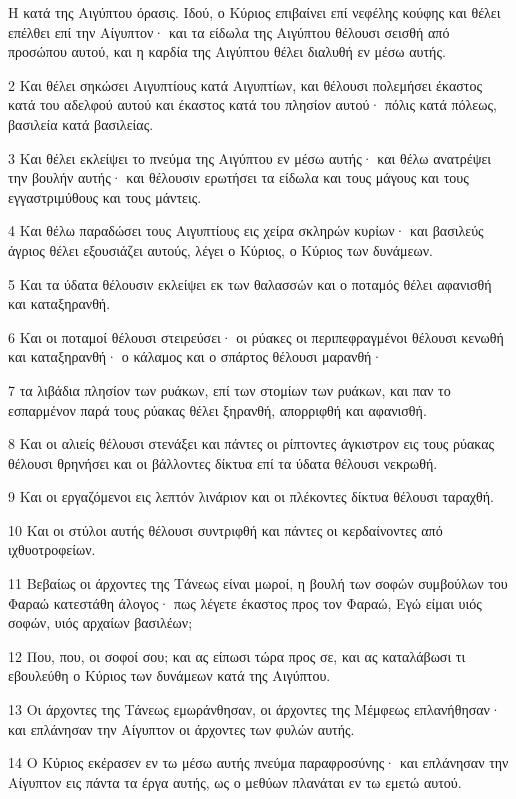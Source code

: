 \par Η κατά της Αιγύπτου όρασις. Ιδού, ο Κύριος επιβαίνει επί νεφέλης κούφης και θέλει επέλθει επί την Αίγυπτον· και τα είδωλα της Αιγύπτου θέλουσι σεισθή από προσώπου αυτού, και η καρδία της Αιγύπτου θέλει διαλυθή εν μέσω αυτής.
\par 2 Και θέλει σηκώσει Αιγυπτίους κατά Αιγυπτίων, και θέλουσι πολεμήσει έκαστος κατά του αδελφού αυτού και έκαστος κατά του πλησίον αυτού· πόλις κατά πόλεως, βασιλεία κατά βασιλείας.
\par 3 Και θέλει εκλείψει το πνεύμα της Αιγύπτου εν μέσω αυτής· και θέλω ανατρέψει την βουλήν αυτής· και θέλουσιν ερωτήσει τα είδωλα και τους μάγους και τους εγγαστριμύθους και τους μάντεις.
\par 4 Και θέλω παραδώσει τους Αιγυπτίους εις χείρα σκληρών κυρίων· και βασιλεύς άγριος θέλει εξουσιάζει αυτούς, λέγει ο Κύριος, ο Κύριος των δυνάμεων.
\par 5 Και τα ύδατα θέλουσιν εκλείψει εκ των θαλασσών και ο ποταμός θέλει αφανισθή και καταξηρανθή.
\par 6 Και οι ποταμοί θέλουσι στειρεύσει· οι ρύακες οι περιπεφραγμένοι θέλουσι κενωθή και καταξηρανθή· ο κάλαμος και ο σπάρτος θέλουσι μαρανθή·
\par 7 τα λιβάδια πλησίον των ρυάκων, επί των στομίων των ρυάκων, και παν το εσπαρμένον παρά τους ρύακας θέλει ξηρανθή, απορριφθή και αφανισθή.
\par 8 Και οι αλιείς θέλουσι στενάξει και πάντες οι ρίπτοντες άγκιστρον εις τους ρύακας θέλουσι θρηνήσει και οι βάλλοντες δίκτυα επί τα ύδατα θέλουσι νεκρωθή.
\par 9 Και οι εργαζόμενοι εις λεπτόν λινάριον και οι πλέκοντες δίκτυα θέλουσι ταραχθή.
\par 10 Και οι στύλοι αυτής θέλουσι συντριφθή και πάντες οι κερδαίνοντες από ιχθυοτροφείων.
\par 11 Βεβαίως οι άρχοντες της Τάνεως είναι μωροί, η βουλή των σοφών συμβούλων του Φαραώ κατεστάθη άλογος· πως λέγετε έκαστος προς τον Φαραώ, Εγώ είμαι υιός σοφών, υιός αρχαίων βασιλέων;
\par 12 Που, που, οι σοφοί σου; και ας είπωσι τώρα προς σε, και ας καταλάβωσι τι εβουλεύθη ο Κύριος των δυνάμεων κατά της Αιγύπτου.
\par 13 Οι άρχοντες της Τάνεως εμωράνθησαν, οι άρχοντες της Μέμφεως επλανήθησαν· και επλάνησαν την Αίγυπτον οι άρχοντες των φυλών αυτής.
\par 14 Ο Κύριος εκέρασεν εν τω μέσω αυτής πνεύμα παραφροσύνης· και επλάνησαν την Αίγυπτον εις πάντα τα έργα αυτής, ως ο μεθύων πλανάται εν τω εμετώ αυτού.
